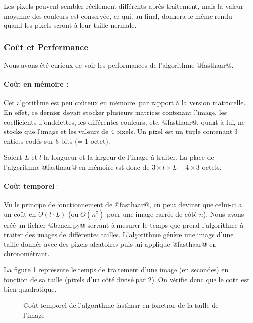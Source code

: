 \documentclass{article}
\begin{document}
Les pixels peuvent sembler réellement différents après traitement, mais la valeur moyenne des couleurs est conservée, ce qui, au final, donnera le même rendu quand les pixels seront à leur taille normale.

\clearpage

\subsubsection{Coût et Performance}

Nous avons été curieux de voir les performances de l'algorithme @fasthaar@.

\paragraph{Coût en mémoire :}

Cet algorithme est peu coûteux en mémoire, par rapport à la version matricielle. En effet, ce dernier devait stocker plusieurs matrices contenant l'image, les coefficients d'ondelettes, les différentes couleurs, etc. @fasthaar@, quant à lui, ne stocke que l'image et les valeurs de 4 pixels. Un pixel est un tuple contenant 3 entiers codés sur 8 bits (= 1 octet). 

Soient $L$ et $l$ la longueur et la largeur de l'image à traiter. 
La place de l'algorithme @fasthaar@ en mémoire est donc de $3\times{}l\times{}L + 4 \times{} 3$ octets.

\paragraph{Coût temporel :}

Vu le principe de fonctionnement de @fasthaar@, on peut deviner que celui-ci a un coût en $O(l\cdot L)$ (ou $O(n^2)$ pour une image carrée de côté $n$). Nous avons créé un fichier @bench.py@ servant à mesurer le temps que prend l'algorithme à traiter des images de différentes tailles. L'algorithme génère une image d'une taille donnée avec des pixels aléatoires puis lui applique @fasthaar@ en chronométrant. 

La figure \ref{bench1} représente le temps de traitement d'une image (en secondes) en fonction de sa taille (pixels d'un côté divisé par 2). On vérifie donc que le coût est bien quadratique. 

\begin{figure}[!h]
\begin{center}


\caption{Coût temporel de l'algorithme fasthaar en fonction de la taille de l'image}
\label{bench1}
\end{center}
\end{figure}
\end{document}

